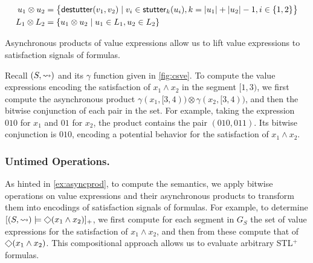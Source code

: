 \vspace{-1.25em}
\small
\begin{align*}
	u_1 \otimes u_2 &= \big\{ \destutter(v_1, v_2) \st v_i \in \stutter_k(u_i), k = |u_1| + |u_2| - 1, i \in 
	\{1,2\} \big\} \\ \vspace{-0.5em}
	L_1 \otimes L_2 &= \{ u_1 \otimes u_2 \st u_1 \in L_1, u_2 \in L_2 \}
\end{align*}
\normalsize

\vspace{-0.5em}
Asynchronous products of value expressions allow us to lift value expressions to satisfaction signals of formulas.

\vspace{-0.5em}
\begin{example} \label{ex:asyncprod}
	Recall $(S, {\rightsquigarrow})$ and its $\gamma$ function given in \cref{fig:csve}.
	To compute the value expressions encoding the satisfaction of $x_1 \land x_2$ in the segment $[1,3)$, we first compute the asynchronous product $\gamma(x_1, [3,4)) \otimes \gamma(x_2, [3,4))$, and then the bitwise conjunction of each pair in the set.
	For example, taking the expression $0  1  0$ for $x_1$ and $0  1$ for $x_2$, the product contains the pair $(010, 011)$.
	Its bitwise conjunction is $0  1  0$, encoding a potential behavior for the satisfaction of $x_1 \land x_2$.
\end{example}

\vspace{-0.7em}
\subsubsection{Untimed Operations.}
As hinted in \cref{ex:asyncprod}, to compute the semantics, we apply bitwise operations on value expressions and their asynchronous products to transform them into encodings of satisfaction signals of formulas.
For example, to determine $[(S, {\hb}) \models \LTLeventually (x_1 \land x_2)]_+$, we first compute for each segment in $G_S$ the set of value expressions for the satisfaction of $x_1 \land x_2$, and then from these compute that of $\LTLeventually (x_1 \land x_2)$.
This compositional approach allows us to evaluate arbitrary STL$^+$ formulas.

